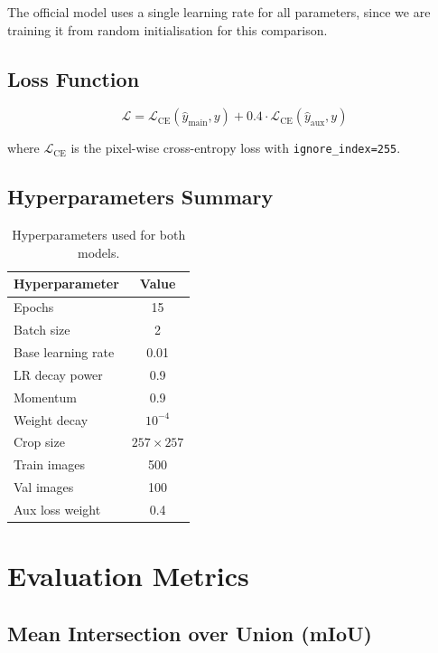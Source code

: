 \documentclass[12pt,a4paper]{article}
\newcommand{\code}[1]{\texttt{#1}}
\begin{document}
The official model uses a single learning rate for all parameters, since we
are training it from random initialisation for this comparison.

\subsection{Loss Function}

\[
    \mathcal{L} = \mathcal{L}_{\text{CE}}(\hat{y}_{\text{main}}, y)
                + 0.4 \cdot \mathcal{L}_{\text{CE}}(\hat{y}_{\text{aux}}, y)
\]

where $\mathcal{L}_{\text{CE}}$ is the pixel-wise cross-entropy loss with
\code{ignore\_index=255}.

\subsection{Hyperparameters Summary}

\begin{table}[H]
\centering
\caption{Hyperparameters used for both models.}
\label{tab:hyperparams}
\begin{tabular}{lc}
\toprule
\textbf{Hyperparameter} & \textbf{Value} \\
\midrule
Epochs           & 15 \\
Batch size       & 2 \\
Base learning rate & 0.01 \\
LR decay power   & 0.9 \\
Momentum         & 0.9 \\
Weight decay     & $10^{-4}$ \\
Crop size        & $257\times257$ \\
Train images     & 500 \\
Val images       & 100 \\
Aux loss weight  & 0.4 \\
\bottomrule
\end{tabular}
\end{table}

\section{Evaluation Metrics}

\subsection{Mean Intersection over Union (mIoU)}
\end{document}
